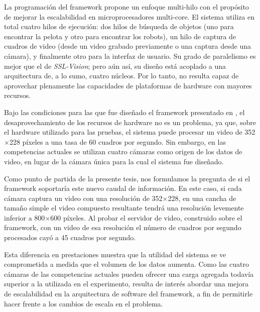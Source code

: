 La programación del framework propone un enfoque multi-hilo con el propósito de
mejorar la escalabilidad en microprocesadores multi-core. El sistema utiliza en
total cuatro hilos de ejecución: dos hilos de búsqueda de objetos (uno para
encontrar la pelota y otro para encontrar los robots), un hilo de captura de
cuadros de video (desde un video grabado previamente o una captura desde una
cámara), y finalmente otro para la interfaz de usuario. Su grado de paralelismo
es mejor que el de \emph{SSL-Vision}; pero aún así, su diseño está acoplado a
una arquitectura de, a lo sumo, cuatro núcleos. Por lo tanto, no resulta capaz
de aprovechar plenamente las capacidades de plataformas de hardware con mayores
recursos.

Bajo las condiciones para las que fue diseñado el framework presentado en
\cite{torres2014}, el desaprovechamiento de los recursos de hardware no es un
problema, ya que, sobre el hardware utilizado para las pruebas, el sistema puede
procesar un video de 352$\times$228 píxeles a una tasa de 60 cuadros por
segundo. Sin embargo, en las competencias actuales se utilizan cuatro cámaras
como origen de los datos de video, en lugar de la cámara única para la cual el
sistema fue diseñado.

Como punto de partida de la presente tesis, nos formulamos la pregunta de si el
framework soportaría este nuevo caudal de información. En este caso, si cada
cámara captura un video con una resolución de 352$\times$228, en una cancha de
tamaño simple el video compuesto resultante tendrá una resolución levemente
inferior a 800$\times$600 píxeles. Al probar el servidor de video, construido
sobre el framework, con un video de esa resolución el número de cuadros por
segundo procesados cayó a 45 cuadros por segundo.

Esta diferencia en prestaciones muestra que la utilidad del sistema se ve
comprometida a medida que el volumen de los datos aumenta. Como las cuatro
cámaras de las competencias actuales pueden ofrecer una carga agregada todavía
superior a la utilizada en el experimento, resulta de interés abordar una mejora
de escalabilidad en la arquitectura de software del framework, a fin de
permitirle hacer frente a los cambios de escala en el problema.
